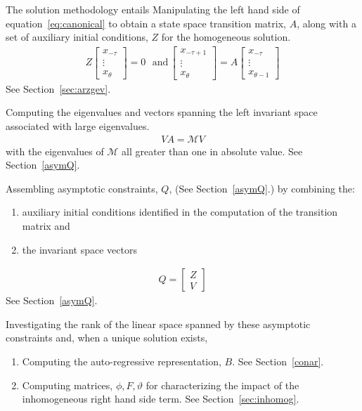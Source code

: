 \documentclass{beamer}
\begin{document}
\begin{frame}
The solution methodology entails 
Manipulating the left hand side of equation~\ref{eq:canonical} to obtain
 a state space transition matrix, $A$, along with
a set of auxiliary initial conditions, $Z$ for the homogeneous solution.
\begin{gather}
  Z
  \begin{bmatrix}
    x_{-\tau}\\ \vdots \\ x_{\theta}
  \end{bmatrix}=0 \,\,\,\,\text{and}\,   \begin{bmatrix}
    x_{-\tau+1}\\ \vdots \\ x_{\theta}
  \end{bmatrix}
=A   \begin{bmatrix}
    x_{-\tau}\\ \vdots \\ x_{\theta-1}
  \end{bmatrix}
\end{gather}
See Section~\ref{sec:arzgev}.
\end{frame}
\begin{frame}


 Computing the eigenvalues and vectors spanning 
the left invariant space associated with
large eigenvalues. 
\begin{gather}
 V A =   \mathcal{M}  V 
\end{gather}
with the eigenvalues of $ \mathcal{M}$ all greater than one in absolute value.
See Section~\ref{asymQ}.
\end{frame}
\begin{frame}


 Assembling asymptotic
constraints, $Q$, (See Section~\ref{asymQ}.)  by combining the:
  \begin{enumerate}
\item  auxiliary initial conditions identified in the computation of the transition matrix and 
\item the invariant space vectors
  \end{enumerate}
\begin{gather}
  Q= 
  \begin{bmatrix}
    Z\\V
  \end{bmatrix}
\end{gather}
See Section~\ref{asymQ}.
\end{frame}
\begin{frame}
 Investigating the rank of the linear space spanned by these asymptotic
constraints and,  when a unique solution exists, 
\begin{enumerate}
\item Computing the auto-regressive 
representation, $B$. See Section~\ref{conar}.
\item Computing matrices, $\phi, F, \vartheta$ 
for characterizing the impact of the inhomogeneous
right hand side term. See Section~\ref{sec:inhomog}.

\end{enumerate}
\end{frame}
\end{document}
